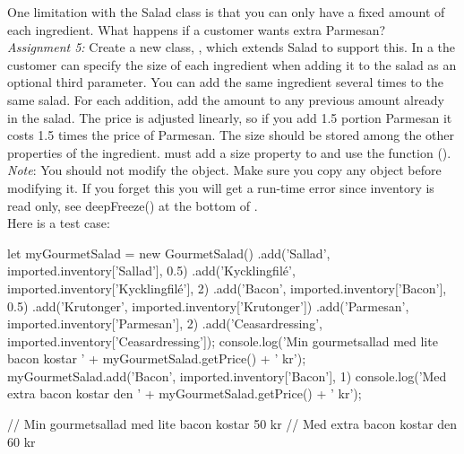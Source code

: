 \documentclass[fleqn, article, a4paper]{memoir}
\begin{document}
\begin{Assignments}
\item One limitation with the Salad class is that you can only have a fixed amount of each ingredient. What happens if a customer wants extra Parmesan?
\\\emph{Assignment 5:} 
Create a new class, , which extends Salad to support this. In a  the customer can specify the size of each ingredient when adding it to the salad as an optional third parameter. You can add the same ingredient several times to the same salad. For each addition, add the amount to any previous amount already in the salad. The price is adjusted linearly, so if you add 1.5 portion Parmesan it costs 1.5 times the price of Parmesan. The size should be stored among the other properties of the ingredient.
 must add a size property to  and use the  function (). 
\\\emph{Note}: You should not modify the  object. Make sure you copy any object before modifying it. If you forget this you will get a run-time error since inventory is read only, see deepFreeze() at the bottom of .
\\ Here is a test case:
\begin{Code}
let myGourmetSalad = new GourmetSalad()
.add('Sallad', imported.inventory['Sallad'], 0.5)
.add('Kycklingfilé', imported.inventory['Kycklingfilé'], 2)
.add('Bacon', imported.inventory['Bacon'], 0.5)
.add('Krutonger', imported.inventory['Krutonger'])
.add('Parmesan', imported.inventory['Parmesan'], 2)
.add('Ceasardressing', imported.inventory['Ceasardressing']);
console.log('Min gourmetsallad med lite bacon kostar '
    + myGourmetSalad.getPrice() + ' kr');
myGourmetSalad.add('Bacon', imported.inventory['Bacon'], 1)
console.log('Med extra bacon kostar den '
    + myGourmetSalad.getPrice() + ' kr');

// Min gourmetsallad med lite bacon kostar 50 kr
// Med extra bacon kostar den 60 kr
\end{Code}


\end{Assignments}
\end{document}
